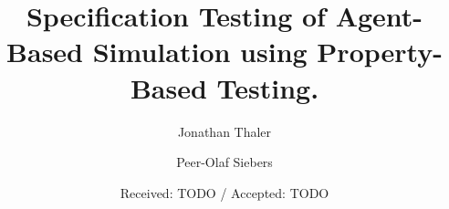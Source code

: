 \documentclass[smallextended]{svjour3}       %
\begin{document}
\title{Specification Testing of Agent-Based Simulation using Property-Based Testing.
}


\author{Jonathan Thaler         \and
        Peer-Olaf Siebers %
}



\date{Received: TODO / Accepted: TODO}

\maketitle
\end{document}
